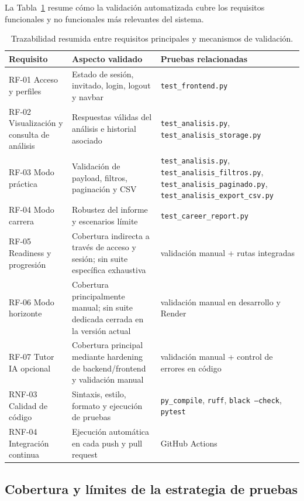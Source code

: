 La Tabla~\ref{tab:trazabilidad-pruebas} resume cómo la validación automatizada cubre los requisitos funcionales y no funcionales más relevantes del sistema.

\begin{table}[htbp]
\centering
\small
\renewcommand{\arraystretch}{1.15}
\begin{tabular}{|p{}|p{}|p{}|}
\hline
\textbf{Requisito} & \textbf{Aspecto validado} & \textbf{Pruebas relacionadas} \\ \hline
RF-01 Acceso y perfiles & Estado de sesión, invitado, login, logout y navbar & \texttt{test\_frontend.py} \\ \hline
RF-02 Visualización y consulta de análisis & Respuestas válidas del análisis e historial asociado & \texttt{test\_analisis.py}, \texttt{test\_analisis\_storage.py} \\ \hline
RF-03 Modo práctica & Validación de payload, filtros, paginación y CSV & \texttt{test\_analisis.py}, \texttt{test\_analisis\_filtros.py}, \texttt{test\_analisis\_paginado.py}, \texttt{test\_analisis\_export\_csv.py} \\ \hline
RF-04 Modo carrera & Robustez del informe y escenarios límite & \texttt{test\_career\_report.py} \\ \hline
RF-05 Readiness y progresión & Cobertura indirecta a través de acceso y sesión; sin suite específica exhaustiva & validación manual + rutas integradas \\ \hline
RF-06 Modo horizonte & Cobertura principalmente manual; sin suite dedicada cerrada en la versión actual & validación manual en desarrollo y Render \\ \hline
RF-07 Tutor IA opcional & Cobertura principal mediante hardening de backend/frontend y validación manual & validación manual + control de errores en código \\ \hline
RNF-03 Calidad de código & Sintaxis, estilo, formato y ejecución de pruebas & \texttt{py\_compile}, \texttt{ruff}, \texttt{black --check}, \texttt{pytest} \\ \hline
RNF-04 Integración continua & Ejecución automática en cada push y pull request & GitHub Actions \\ \hline
\end{tabular}
\caption{Trazabilidad resumida entre requisitos principales y mecanismos de validación.}
\label{tab:trazabilidad-pruebas}
\end{table}

\subsection{Cobertura y límites de la estrategia de pruebas}

